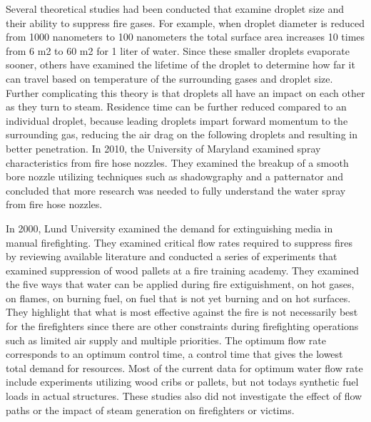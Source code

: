 \documentclass{article}
\begin{document}
Several theoretical studies had been conducted that examine droplet size and their ability to suppress fire gases. For example, when droplet diameter is reduced from 1000 nanometers to 100 nanometers the total surface area increases 10 times from 6 m2 to 60 m2 for 1 liter of water. Since these smaller droplets evaporate sooner, others have examined the lifetime of the droplet to determine how far it can travel based on temperature of the surrounding gases and droplet size. Further complicating this theory is that droplets all have an impact on each other as they turn to steam. Residence time can be further reduced compared to an individual droplet, because leading droplets impart forward momentum to the surrounding gas, reducing the air drag on the following droplets and resulting in better penetration. In 2010, the University of Maryland examined spray characteristics from fire hose nozzles. They examined the breakup of a smooth bore nozzle utilizing techniques such as shadowgraphy and a patternator and concluded that more research was needed to fully understand the water spray from fire hose nozzles.  

In 2000, Lund University examined the demand for extinguishing media in manual firefighting. They examined critical flow rates required to suppress fires by reviewing available literature and conducted a series of experiments that examined suppression of wood pallets at a fire training academy. They examined the five ways that water can be applied during fire extiguishment, on hot gases, on flames, on burning fuel, on fuel that is not yet burning and on hot surfaces. They highlight that what is most effective against the fire is not necessarily best for the firefighters since there are other constraints during firefighting operations such as limited air supply and multiple priorities. The optimum flow rate corresponds to an optimum control time, a control time that gives the lowest total demand for resources. Most of the current data for optimum water flow rate include experiments utilizing wood cribs or pallets, but not todays synthetic fuel loads in actual structures.  These studies also did not investigate the effect of flow paths or the impact of steam generation on firefighters or victims.
\end{document}
